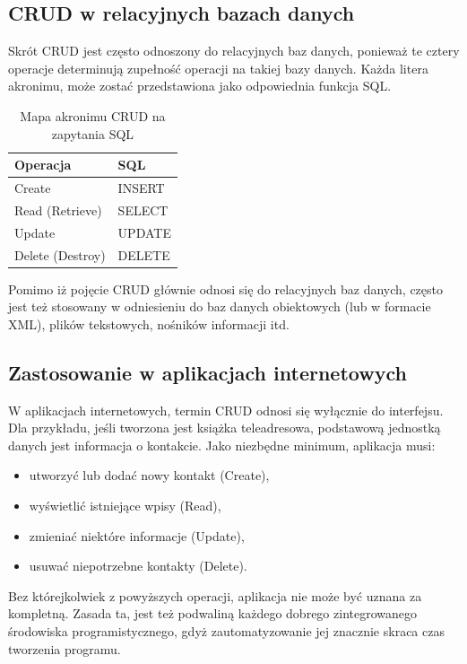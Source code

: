 \documentclass[a4paper,12pt,oneside]{report}
\begin{document}
\subsection{CRUD w relacyjnych bazach danych}
\label{sub:crud-db}
Skrót CRUD jest często odnoszony do relacyjnych baz danych, ponieważ te cztery operacje determinują zupełność operacji na takiej bazy danych. Każda litera akronimu, może zostać przedstawiona jako odpowiednia funkcja SQL.
\begin{table}[h]
  \centering
    \begin{tabular}{|l|l|} \hline
    Operacja         & SQL \\\hline
    Create           & INSERT \\
    Read (Retrieve)  & SELECT \\
    Update           & UPDATE \\
    Delete (Destroy) & DELETE \\\hline
    \end{tabular}
    \caption{Mapa akronimu CRUD na zapytania SQL\label{crud:sql}}
\end{table}
Pomimo iż pojęcie CRUD głównie odnosi się do relacyjnych baz danych, często jest też stosowany w odniesieniu do baz danych obiektowych (lub w formacie XML), plików tekstowych, nośników informacji itd.

\subsection{Zastosowanie w aplikacjach internetowych}
\label{crud:web}
W aplikacjach internetowych, termin CRUD odnosi się wyłącznie do interfejsu. Dla przykładu, jeśli tworzona jest książka teleadresowa, podstawową jednostką danych jest informacja o kontakcie. Jako niezbędne minimum, aplikacja musi:

\begin{itemize}
  \item utworzyć lub dodać nowy kontakt (Create),
  \item wyświetlić istniejące wpisy (Read),
  \item zmieniać niektóre informacje (Update),
  \item usuwać niepotrzebne kontakty (Delete).
\end{itemize}

Bez którejkolwiek z powyższych operacji, aplikacja nie może być uznana za kompletną. Zasada ta, jest też podwaliną każdego dobrego zintegrowanego środowiska programistycznego, gdyż zautomatyzowanie jej znacznie skraca czas tworzenia programu.
\end{document}
